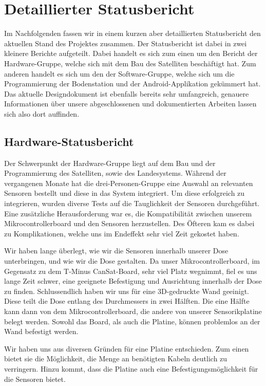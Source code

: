 \section{Detaillierter Statusbericht}
Im Nachfolgenden fassen wir in einem kurzen aber detaillierten Statusbericht den aktuellen Stand des Projektes zusammen. Der Statusbericht ist dabei in zwei kleinere Berichte aufgeteilt. Dabei handelt es sich zum einen um den Bericht der Hardware-Gruppe, welche sich mit dem Bau des Satelliten beschäftigt hat. Zum anderen handelt es sich um den der Software-Gruppe, welche sich um die Programmierung der Bodenstation und der Android-Applikation gekümmert hat. Das aktuelle Designdokument ist ebenfalls bereits sehr umfangreich, genauere Informationen über unsere abgeschlossenen und dokumentierten Arbeiten lassen sich also dort auffinden.

\subsection{Hardware-Statusbericht}
Der Schwerpunkt der Hardware-Gruppe liegt auf dem Bau und der Programmierung des Satelliten, sowie des Landesystems. Während der vergangenen Monate hat die drei-Personen-Gruppe eine Auswahl an relevanten Sensoren bestellt und diese in das System integriert. Um diese erfolgreich zu integrieren, wurden diverse Tests auf die Tauglichkeit der Sensoren durchgeführt. Eine zusätzliche Herausforderung war es, die Kompatibilität zwischen unserem Mikrocontrollerboard und den Sensoren herzustellen. Des Öfteren kam es dabei zu Komplikationen, welche uns im Endeffekt sehr viel Zeit gekostet haben.

Wir haben lange überlegt, wie wir die Sensoren innerhalb unserer Dose unterbringen, und wie wir die Dose gestalten. Da unser Mikrocontrollerboard, im Gegensatz zu dem T-Minus CanSat-Board, sehr viel Platz wegnimmt, fiel es uns lange Zeit schwer, eine geeignete Befestigung und Ausrichtung innerhalb der Dose zu finden. Schlussendlich haben wir uns für eine 3D-gedruckte Wand geeinigt. Diese teilt die Dose entlang des Durchmessers in zwei Hälften. Die eine Hälfte kann dann von dem Mikrocontrollerboard, die andere von unserer Sensorikplatine belegt werden. Sowohl das Board, als auch die Platine, können problemlos an der Wand befestigt werden.

Wir haben uns aus diversen Gründen für eine Platine entschieden. Zum einen bietet sie die Möglichkeit, die Menge an benötigten Kabeln deutlich zu verringern. Hinzu kommt, dass die Platine auch eine Befestigungsmöglichkeit für die Sensoren bietet.

